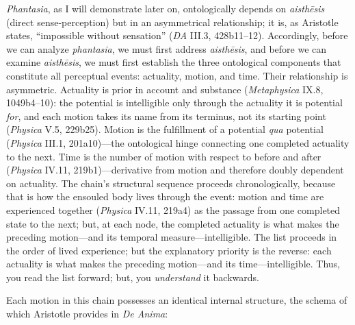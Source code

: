 \documentclass{article}
\begin{document}
\textit{Phantasia}, as I will demonstrate later on, ontologically depends on \textit{aisthēsis} (direct sense-perception) but in an asymmetrical relationship; it is, as Aristotle states, ``impossible without sensation'' (\textit{DA} III.3, 428b11--12). Accordingly, before we can analyze \textit{phantasia}, we must first address \textit{aisthēsis}, and before we can examine \textit{aisthēsis}, we must first establish the three ontological components that constitute all perceptual events: actuality, motion, and time. Their relationship is asymmetric. Actuality is prior in account and substance (\textit{Metaphysica} IX.8, 1049b4--10): the potential is intelligible only through the actuality it is potential \textit{for}, and each motion takes its name from its terminus, not its starting point (\textit{Physica} V.5, 229b25). Motion is the fulfillment of a potential \textit{qua} potential (\textit{Physica} III.1, 201a10)---the ontological hinge connecting one completed actuality to the next. Time is the number of motion with respect to before and after (\textit{Physica} IV.11, 219b1)---derivative from motion and therefore doubly dependent on actuality. The chain's structural sequence proceeds chronologically, because that is how the ensouled body lives through the event: motion and time are experienced together (\textit{Physica} IV.11, 219a4) as the passage from one completed state to the next; but, at each node, the completed actuality is what makes the preceding motion---and its temporal measure---intelligible. The list proceeds in the order of lived experience; but the explanatory priority is the reverse: each actuality is what makes the preceding motion---and its time---intelligible. Thus, you read the list forward; but, you \textit{understand} it backwards. 

Each motion in this chain possesses an identical internal structure, the schema of which Aristotle provides in \textit{De Anima}: 
\end{document}
